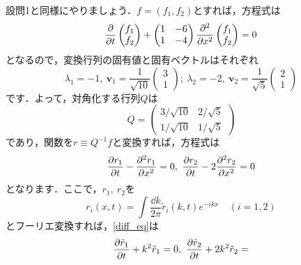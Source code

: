 \documentclass[a4paper,pdflatex,ja=standard]{bxjsarticle}
\begin{document}
\begin{enumerate}
  設問1と同様にやりましょう．$f=(f_1,f_2)$とすれば，方程式は
  \begin{equation}
    \pdv{}{t}
    \begin{pmatrix}
      f_1 \\
      f_2
    \end{pmatrix}
    +
    \begin{pmatrix}
      1 & -6 \\
      1 & -4
    \end{pmatrix}
    \pdv[2]{}{x}
    \begin{pmatrix}
      f_1 \\
      f_2
    \end{pmatrix}
    =
    0
  \end{equation}
  となるので，変換行列の固有値と固有ベクトルはそれぞれ
  \begin{equation}
    \lambda_1=-1
    ,\ 
    \bm{v}_1
    =
    \frac{1}{\sqrt{10}}
    \begin{pmatrix}
      3 \\
      1
    \end{pmatrix}
    ;\ 
    \lambda_2=-2
    ,\ 
    \bm{v}_2
    =
    \frac{1}{\sqrt{5}}
    \begin{pmatrix}
      2 \\
      1
    \end{pmatrix}
  \end{equation}
  です．よって，対角化する行列$Q$は
  \begin{equation}
    Q
    =
    \begin{pmatrix}
      3/\sqrt{10} & 2/\sqrt{5} \\
      1/\sqrt{10} & 1/\sqrt{5}
    \end{pmatrix}
  \end{equation}
  であり，関数を$r\equiv Q^{-1}f$と変換すれば，方程式は
  \begin{equation}
    \pdv{r_1}{t}-\pdv[2]{r_1}{x}=0
    ,\ 
    \pdv{r_2}{t}-2\pdv[2]{r_2}{x}=0
    \label{diff_eq}
  \end{equation}
  となります．ここで，$r_1,\ r_2$を
  \begin{equation}
    r_i(x,t)
    =
    \int\frac{\dd k}{2\pi}\tilde{r}_i(k,t)e^{-ikx}
    \quad
    (i=1,2)
    \label{fourier_transf}
  \end{equation}
  とフーリエ変換すれば，\eqref{diff_eq}は
  \begin{equation}
    \pdv{\tilde{r}_1}{t}
    +
    k^2\tilde{r}_1
    =
    0
    ,\ 
    \pdv{\tilde{r}_2}{t}
    +
    2
    k^2\tilde{r}_2
    =

\end{equation}
\end{enumerate}
\end{document}
